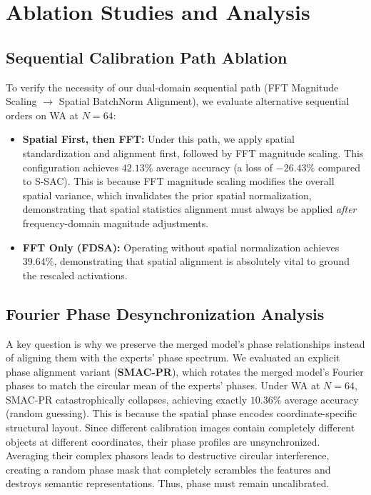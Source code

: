\documentclass{article}
\theoremstyle{plain}
\theoremstyle{definition}
\theoremstyle{remark}
\begin{document}
\section{Ablation Studies and Analysis}
\label{sec:ablation}

\subsection{Sequential Calibration Path Ablation}
To verify the necessity of our dual-domain sequential path (FFT Magnitude Scaling $\rightarrow$ Spatial BatchNorm Alignment), we evaluate alternative sequential orders on WA at $N=64$:
\begin{itemize}
    \item \textbf{Spatial First, then FFT:} Under this path, we apply spatial standardization and alignment first, followed by FFT magnitude scaling. This configuration achieves $42.13\%$ average accuracy (a loss of $-26.43\%$ compared to S-SAC). This is because FFT magnitude scaling modifies the overall spatial variance, which invalidates the prior spatial normalization, demonstrating that spatial statistics alignment must always be applied \textit{after} frequency-domain magnitude adjustments.
    \item \textbf{FFT Only (FDSA):} Operating without spatial normalization achieves $39.64\%$, demonstrating that spatial alignment is absolutely vital to ground the rescaled activations.
\end{itemize}

\subsection{Fourier Phase Desynchronization Analysis}
A key question is why we preserve the merged model's phase relationships instead of aligning them with the experts' phase spectrum. We evaluated an explicit phase alignment variant (\textbf{SMAC-PR}), which rotates the merged model's Fourier phases to match the circular mean of the experts' phases.
Under WA at $N=64$, SMAC-PR catastrophically collapses, achieving exactly $10.36\%$ average accuracy (random guessing). This is because the spatial phase encodes coordinate-specific structural layout. Since different calibration images contain completely different objects at different coordinates, their phase profiles are unsynchronized. Averaging their complex phasors leads to destructive circular interference, creating a random phase mask that completely scrambles the features and destroys semantic representations. Thus, phase must remain uncalibrated.
\end{document}
